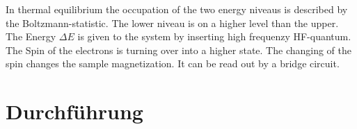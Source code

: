 In thermal equilibrium the occupation of the two energy niveaus is described
by the Boltzmann-statistic. The lower niveau is on a higher level than the upper.
The Energy $\Delta E$ is given to the system by inserting high frequenzy HF-quantum.
The Spin of the electrons is turning over into a higher state.
The changing of the spin changes the sample magnetization.
It can be read out by a bridge circuit. 


\section{Durchführung}

